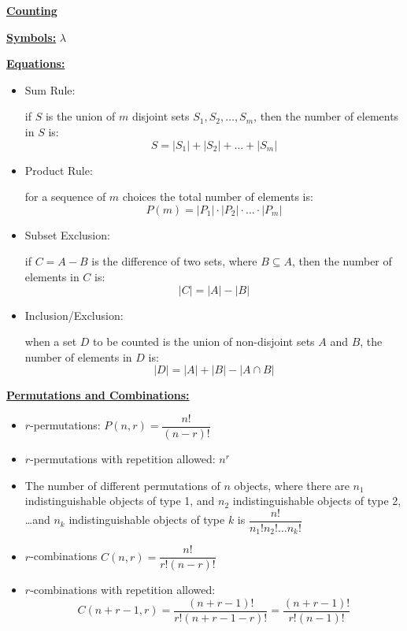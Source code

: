 \documentclass[11pt]{article}
\begin{document}
\newpage
\begin{center}\underline{\bf \huge Counting}\end{center}
\bigskip

\underline{\bf Symbols:} $\lambda$
\bigskip

\underline{\bf Equations:}
\begin{itemize}
    \item Sum Rule: 
    
    if $S$ is the union of $m$ disjoint sets $S_1, S_2, \dots, S_m$, then the number of elements in $S$ is: 
$$ S = |S_1| + |S_2| + \dots + |S_m| $$
    \item Product Rule: 
    
    for a sequence of $m$ choices the total number of elements is: 
$$ P(m) = |P_1|\cdot |P_2| \cdot \dots \cdot |P_m| $$
    \item Subset Exclusion: 
    
    if $C = A - B$ is the difference of two sets, where $B \subseteq A$, then the number of elements in $C$ is:
$$ |C| = |A| - |B| $$
    \item Inclusion/Exclusion: 
    
    when a set $D$ to be counted is the union of non-disjoint sets $A$ and $B$, the number of elements in $D$ is:
$$ |D| = |A| + |B| - |A\cap B| $$
\end{itemize}
\bigskip

\underline{\bf Permutations and Combinations:}
\begin{itemize}
    \item $r$-permutations: $P(n,r) = \dfrac{n!}{(n-r)!}$
    \item $r$-permutations with repetition allowed: $n^r$
    \item The number of different permutations of $n$ objects, where there are $n_1$
indistinguishable objects of type 1, and $n_2$ indistinguishable objects
of type 2, \dots and $n_k$ indistinguishable objects of type $k$ is $\dfrac{n!}{n_1! n_2! \dots n_k!}$
    \item $r$-combinations $C(n,r) = \dfrac{n!}{r!(n-r)!}$
    \item $r$-combinations with repetition allowed: 
    $$C(n+r-1,r) = \dfrac{(n+r-1)!}{r!(n+r-1-r)!} = \dfrac{(n+r-1)!}{r!(n-1)!}$$
\end{itemize}
\end{document}
